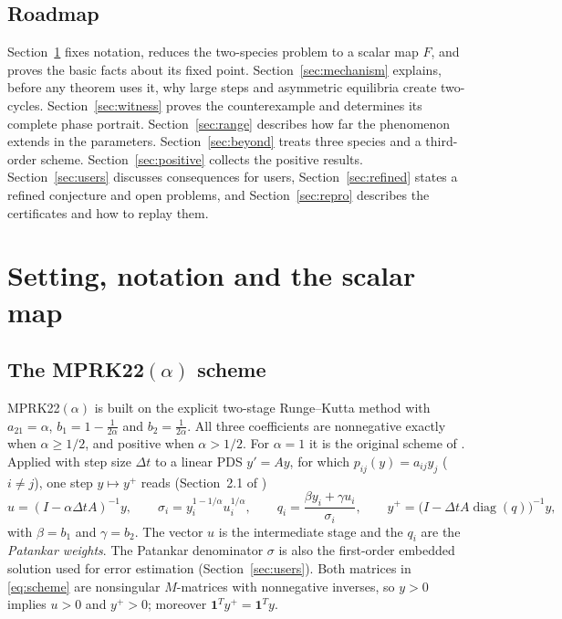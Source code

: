 \documentclass[11pt,a4paper]{article}
\theoremstyle{plain}
\theoremstyle{definition}
\newcommand{\diag}{\operatorname{diag}}
\begin{document}
\subsection{Roadmap}

Section~\ref{sec:setting} fixes notation, reduces the two-species problem to a scalar map $F$, and proves the basic facts about its fixed point. Section~\ref{sec:mechanism} explains, before any theorem uses it, why large steps and asymmetric equilibria create two-cycles. Section~\ref{sec:witness} proves the counterexample and determines its complete phase portrait. Section~\ref{sec:range} describes how far the phenomenon extends in the parameters. Section~\ref{sec:beyond} treats three species and a third-order scheme. Section~\ref{sec:positive} collects the positive results. Section~\ref{sec:users} discusses consequences for users, Section~\ref{sec:refined} states a refined conjecture and open problems, and Section~\ref{sec:repro} describes the certificates and how to replay them.

\section{Setting, notation and the scalar map}\label{sec:setting}

\subsection{The \texorpdfstring{MPRK22$(\alpha)$}{MPRK22(alpha)} scheme}

MPRK22$(\alpha)$ \cite{KM2018a} is built on the explicit two-stage Runge--Kutta method with $a_{21}=\alpha$, $b_1=1-\frac1{2\alpha}$ and $b_2=\frac1{2\alpha}$. All three coefficients are nonnegative exactly when $\alpha\ge1/2$, and positive when $\alpha>1/2$. For $\alpha=1$ it is the original scheme of \cite{BDM2003}. Applied with step size $\Delta t$ to a linear PDS $y'=Ay$, for which $p_{ij}(y)=a_{ij}y_j$ ($i\ne j$), one step $y\mapsto y^+$ reads (Section~2.1 of \cite{IKMS2024})
\begin{equation}\label{eq:scheme}
 u=(I-\alpha\Delta t A)^{-1}y,\qquad
 \sigma_i=y_i^{1-1/\alpha}u_i^{1/\alpha},\qquad
 q_i=\frac{\beta y_i+\gamma u_i}{\sigma_i},\qquad
 y^+=\bigl(I-\Delta t A\diag(q)\bigr)^{-1}y,
\end{equation}
with $\beta=b_1$ and $\gamma=b_2$. The vector $u$ is the intermediate stage and the $q_i$ are the \emph{Patankar weights}. The Patankar denominator $\sigma$ is also the first-order embedded solution used for error estimation (Section~\ref{sec:users}). Both matrices in \eqref{eq:scheme} are nonsingular $M$-matrices with nonnegative inverses, so $y>0$ implies $u>0$ and $y^+>0$; moreover $\mathbf 1^Ty^+=\mathbf 1^Ty$.
\end{document}
